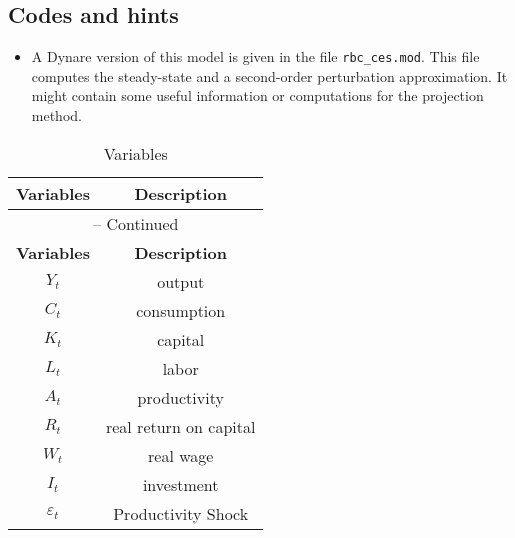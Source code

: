 \documentclass{article}
\begin{document}
\newpage

\subsection*{Codes and hints}

\begin{itemize}
\item
A Dynare version of this model is given in the file \texttt{rbc\_ces.mod}.
This file computes the steady-state and a second-order perturbation approximation.
It might contain some useful information or computations for the projection method.
\end{itemize}

\begin{center}
\begin{longtable}{cc}
\caption{Variables}\label{tbl:RBC.Variables}\\%
\toprule%
\multicolumn{1}{c}{\textbf{Variables}} &
\multicolumn{1}{c}{\textbf{Description}}\\%
\midrule\midrule%
\endfirsthead%
\multicolumn{2}{c}{{\tablename} \thetable{} {--} Continued}\\%
\midrule%
\multicolumn{1}{c}{\textbf{Variables}} &
\multicolumn{1}{c}{\textbf{Description}}\\%
\midrule\midrule%
\endhead%
\({Y_t}\) & output\\
\({C_t}\) & consumption\\
\({K_t}\) & capital\\
\({L_t}\) & labor\\
\({A_t}\) & productivity\\
\({R_t}\) & real return on capital\\
\({W_t}\) & real wage\\
\({I_t}\) & investment\\
\({\varepsilon_t}\) & Productivity Shock\\
\bottomrule%
\end{longtable}
\end{center}
\end{document}
